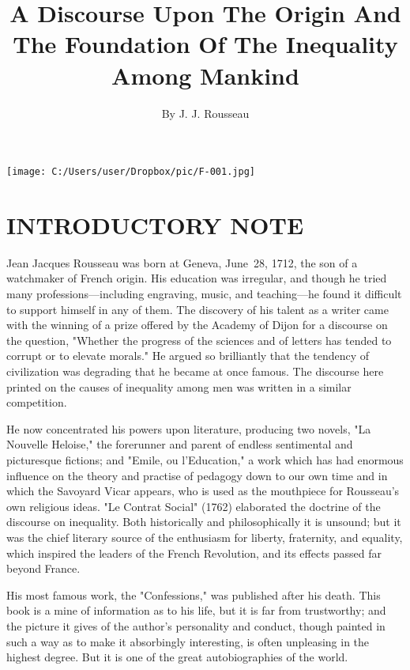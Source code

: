 \documentclass[11pt,twocolumn]{ltugboat}
\title{A Discourse Upon The Origin And The Foundation Of The Inequality Among
Mankind }
\author{By J. J. Rousseau}
\begin{document}
\maketitle

\begin{figure*}
\texttt{[image: C:/Users/user/Dropbox/pic/F-001.jpg]}
\end{figure*}

\section{INTRODUCTORY NOTE}

Jean Jacques Rousseau was born at Geneva, June~28, 1712, the son of a
watchmaker of French origin. His education was irregular, and though
he tried many professions---including engraving, music, and
teaching---he found it difficult to support himself in any of them. The
discovery of his talent as a writer came with the winning of a prize
offered by the Academy of Dijon for a discourse on the question,
"Whether the progress of the sciences and of letters has tended to
corrupt or to elevate morals." He argued so brilliantly that the
tendency of civilization was degrading that he became at once famous.
The discourse here printed on the causes of inequality among men was
written in a similar competition.

He now concentrated his powers upon literature, producing two novels,
"La Nouvelle Heloise," the forerunner and parent of endless
sentimental and picturesque fictions; and "Emile, ou l'Education," a
work which has had enormous influence on the theory and practise of
pedagogy down to our own time and in which the Savoyard Vicar appears,
who is used as the mouthpiece for Rousseau's own religious ideas. "Le
Contrat Social" (1762) elaborated the doctrine of the discourse on
inequality. Both historically and philosophically it is unsound; but
it was the chief literary source of the enthusiasm for liberty,
fraternity, and equality, which inspired the leaders of the French
Revolution, and its effects passed far beyond France.

His most famous work, the "Confessions," was published after his
death. This book is a mine of information as to his life, but it is
far from trustworthy; and the picture it gives of the author's
personality and conduct, though painted in such a way as to make it
absorbingly interesting, is often unpleasing in the highest degree.
But it is one of the great autobiographies of the world.
\end{document}
